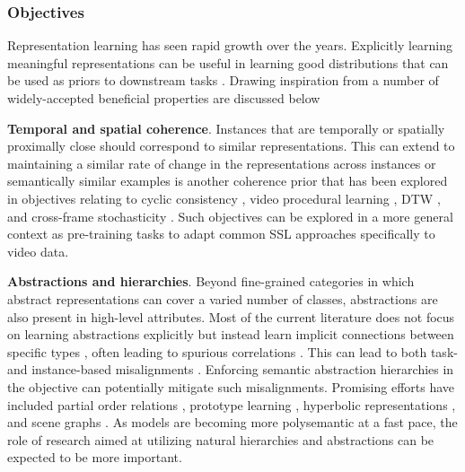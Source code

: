 \subsubsection{Objectives}

Representation learning has seen rapid growth over the years. Explicitly learning meaningful representations can be useful in learning good distributions that can be used as priors to downstream tasks \citep{bengio2013representation,janocha2017loss,larochelle2009exploring}. Drawing inspiration from \citep{bengio2013representation} a number of widely-accepted beneficial properties are discussed below

\noindent
\textbf{Temporal and spatial coherence}. Instances that are temporally or spatially proximally close should correspond to similar representations. This can extend to maintaining a similar rate of change in the representations across instances or semantically similar examples is another coherence prior that has been explored in objectives relating to cyclic consistency \citep{dwibedi2018temporal,donahue2024learning,haresh2021learning}, video procedural learning \citep{chen2022frame,sermanet2018time}, DTW \citep{dvornik2021drop,hadji2021representation}, and cross-frame stochasticity \citep{zhang2023modeling}. Such objectives can be explored in a more general context as pre-training tasks to adapt common SSL approaches specifically to video data. 

\noindent
\textbf{Abstractions and hierarchies}. Beyond fine-grained categories in which abstract representations can cover a varied number of classes, abstractions are also present in high-level attributes. Most of the current literature does not focus on learning abstractions explicitly but instead learn implicit connections between specific types \citep{li2024deal}, often leading to spurious correlations \citep{chen2020counterfactual,kim2023exposing,tian2024argue}. This can lead to both task- and instance-based misalignments \citep{zhang2024rethinking}. Enforcing semantic abstraction hierarchies in the objective can potentially mitigate such misalignments. Promising efforts have included partial order relations \citep{alper2024emergent},  prototype learning \citep{ramesh2022hierarchical}, hyperbolic representations \citep{mettes2024hyperbolic}, and scene graphs \citep{li2024scene}. As models are becoming more polysemantic at a fast pace, the role of research aimed at utilizing natural hierarchies and abstractions can be expected to be more important.

